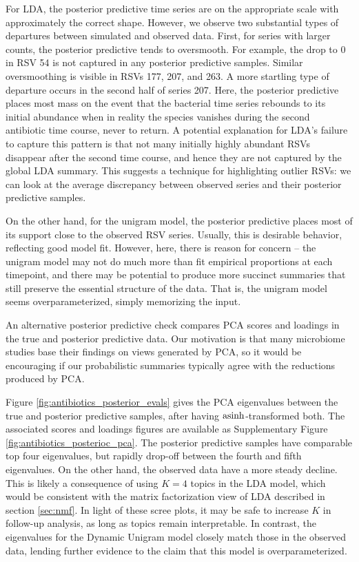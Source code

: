 \documentclass[oupdraft]{bio}
\begin{document}
For LDA, the posterior predictive time series are on the appropriate scale
with approximately the correct shape. However, we observe two substantial types
of departures between simulated and observed data. First, for series with larger
counts, the posterior predictive tends to oversmooth. For example, the drop to 0
in RSV 54 is not captured in any posterior predictive samples. Similar
oversmoothing is visible in RSVs 177, 207, and 263. A more startling type of
departure occurs in the second half of series 207. Here, the posterior
predictive places most mass on the event that the bacterial time series rebounds
to its initial abundance when in reality the species vanishes during the second
antibiotic time course, never to return. A potential explanation for LDA's
failure to capture this pattern is that not many initially highly abundant RSVs
disappear after the second time course, and hence they are not captured by the
global LDA summary. This suggests a technique for highlighting outlier RSVs: we
can look at the average discrepancy between observed series and their posterior
predictive samples.

On the other hand, for the unigram model, the posterior predictive places most
of its support close to the observed RSV series. Usually, this is desirable
behavior, reflecting good model fit. However, here, there is reason for concern
-- the unigram model may not do much more than fit empirical proportions at each
timepoint, and there may be potential to produce more succinct summaries that
still preserve the essential structure of the data. That is, the unigram model
seems overparameterized, simply memorizing the input.

An alternative posterior predictive check compares PCA scores and loadings in
the true and posterior predictive data. Our motivation is that many microbiome
studies base their findings on views generated by PCA, so it would be encouraging
if our probabilistic summaries typically agree with the reductions produced by
PCA.

Figure \ref{fig:antibiotics_posterior_evals} gives the PCA eigenvalues between
the true and posterior predictive samples, after having $\mathop\mathrm{asinh}$-transformed
both. The associated scores and loadings figures are available as Supplementary
Figure \ref{fig:antibiotics_posterioc_pca}. The posterior predictive samples
have comparable top four eigenvalues, but rapidly drop-off between the fourth
and fifth eigenvalues. On the other hand, the observed data have a more steady
decline. This is likely a consequence of using $K = 4$ topics in the LDA model,
which would be consistent with the matrix factorization view of LDA described in
section \ref{sec:nmf}. In light of these scree plots, it may be safe to increase
$K$ in follow-up analysis, as long as topics remain interpretable. In contrast,
the eigenvalues for the Dynamic Unigram model closely match those in the
observed data, lending further evidence to the claim that this model is
overparameterized.
\end{document}
